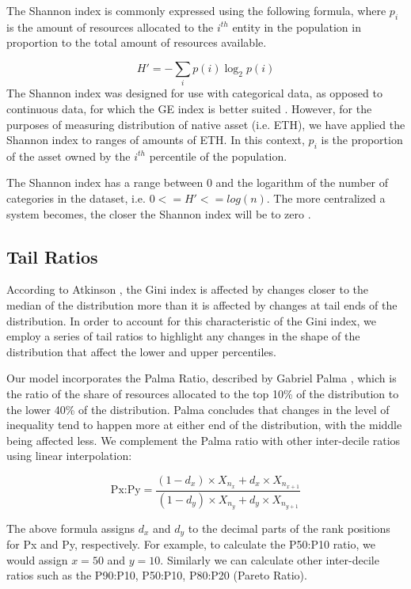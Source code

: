 \documentclass[conference]{IEEEtran}
\begin{document}
The Shannon index is commonly expressed using the following formula, where $p_{i}$ is the amount of resources allocated to the $i^{th}$ entity in the population in proportion to the total amount of resources available.

\[H' = - \sum_{i} p(i) \log_{2} p(i)\]
The Shannon index was designed for use with categorical data, as opposed to continuous data, for which the  GE index is better suited \cite{tran2021harnessing}.   However, for the purposes of measuring distribution of native asset (i.e. ETH), we have applied the Shannon index to ranges of amounts of ETH.  In this context, $p_i$ is the proportion of the asset owned by the $i^{th}$ percentile of the population.

The Shannon index has a range between 0 and the logarithm of the number of categories in the dataset, i.e. $0<=H'<=log(n)$.  The more centralized a system becomes, the closer the Shannon index will be to zero \cite{kusmierz2022centralized}.

\subsection{Tail Ratios}

According to Atkinson \cite{atkinson1970measurement}, the Gini index is affected by changes closer to the median of the distribution more than it is affected by changes at tail ends of the distribution.  In order to account for this characteristic of the Gini index, we employ a series of tail ratios to highlight any changes in the shape of the distribution that affect the lower and upper percentiles.

Our model incorporates the Palma Ratio, described by Gabriel Palma \cite{palma2011homogeneous}, which is the ratio of the share of resources allocated to the top 10\% of the distribution to the lower 40\% of the distribution.  Palma concludes that changes in the level of inequality tend to happen more at either end of the distribution, with the middle being affected less.  We complement the Palma ratio with  other inter-decile ratios using linear interpolation:

\[\text{Px:Py} = \frac{{(1 - d_{x}) \times X_{n_{x}} + d_{x} \times X_{n_{x+1}}}}{{(1 - d_{y}) \times X_{n_{y}} + d_{y} \times X_{n_{y+1}}}}
\]

The above formula assigns $d_x$ and $d_y$ to the decimal parts of the rank positions for Px and Py, respectively. For example, to calculate the P50:P10 ratio, we would assign $x=50$ and $y=10$.  Similarly we can calculate other inter-decile ratios such as the P90:P10, P50:P10, P80:P20 (Pareto Ratio).
\end{document}
